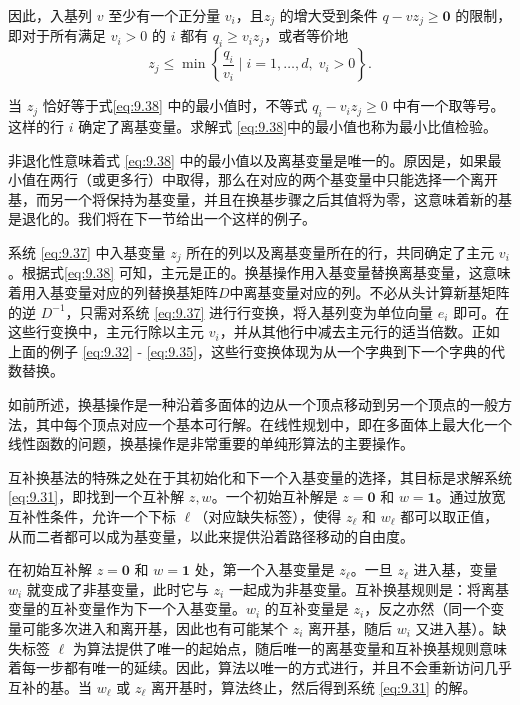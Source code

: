 因此，入基列 \(v\) 至少有一个正分量 \({v}_{i}\)，且\({z}_{j}\) 的增大受到条件 \(q - v{z}_{j} \geq  \mathbf{0}\) 的限制，即对于所有满足 \({v}_{i} > 0\) 的 \(i\) 都有 \({q}_{i} \geq  {v}_{i}{z}_{j}\)，或者等价地
\begin{equation}
\label{eq:9.38}
{z}_{j} \leq  \min \left\{  {\frac{{q}_{i}}{{v}_{i}} \mid  i = 1,\ldots,d,\; {v}_{i} > 0}\right\}.
\end{equation}

当 \({z}_{j}\) 恰好等于式\eqref{eq:9.38} 中的最小值时，不等式 \({q}_{i} - {v}_{i}{z}_{j} \geq  0\) 中有一个取等号。这样的行 \(i\) 确定了离基变量。求解式 \eqref{eq:9.38}中的最小值也称为最小比值检验。

非退化性意味着式 \eqref{eq:9.38} 中的最小值以及离基变量是唯一的。原因是，如果最小值在两行（或更多行）中取得，那么在对应的两个基变量中只能选择一个离开基，而另一个将保持为基变量，并且在换基步骤之后其值将为零，这意味着新的基是退化的。我们将在下一节给出一个这样的例子。

系统 \eqref{eq:9.37} 中入基变量 \({z}_{j}\) 所在的列以及离基变量所在的行，共同确定了主元 \({v}_{i}\)。根据式\eqref{eq:9.38} 可知，主元是正的。换基操作用入基变量替换离基变量，这意味着用入基变量对应的列替换基矩阵\(D\)中离基变量对应的列。不必从头计算新基矩阵的逆 \({D}^{-1}\)，只需对系统 \eqref{eq:9.37} 进行行变换，将入基列变为单位向量 \({e}_{i}\) 即可。在这些行变换中，主元行除以主元 \({v}_{i}\)，并从其他行中减去主元行的适当倍数。正如上面的例子 \eqref{eq:9.32}  - \eqref{eq:9.35}，这些行变换体现为从一个字典到下一个字典的代数替换。


如前所述，换基操作是一种沿着多面体的边从一个顶点移动到另一个顶点的一般方法，其中每个顶点对应一个基本可行解。在线性规划中，即在多面体上最大化一个线性函数的问题，换基操作是非常重要的单纯形算法的主要操作。

互补换基法的特殊之处在于其初始化和下一个入基变量的选择，其目标是求解系统 \eqref{eq:9.31}，即找到一个互补解 \(z,w\)。一个初始互补解是 \(z = \mathbf{0}\) 和 \(w = \mathbf{1}\)。通过放宽互补性条件，允许一个下标 \(\ell\)（对应缺失标签），使得 \({z}_{\ell }\) 和 \({w}_{\ell }\) 都可以取正值，从而二者都可以成为基变量，以此来提供沿着路径移动的自由度。

在初始互补解 \(z = \mathbf{0}\) 和 \(w = \mathbf{1}\) 处，第一个入基变量是 \({z}_{\ell }\)。一旦 \({z}_{\ell }\) 进入基，变量 \({w}_{i}\) 就变成了非基变量，此时它与 \({z}_{i}\) 一起成为非基变量。互补换基规则是：将离基变量的互补变量作为下一个入基变量。\({w}_{i}\) 的互补变量是 \({z}_{i}\)，反之亦然（同一个变量可能多次进入和离开基，因此也有可能某个 \({z}_{i}\) 离开基，随后 \({w}_{i}\) 又进入基）。缺失标签 \(\ell\) 为算法提供了唯一的起始点，随后唯一的离基变量和互补换基规则意味着每一步都有唯一的延续。因此，算法以唯一的方式进行，并且不会重新访问几乎互补的基。当 \({w}_{\ell }\) 或 \({z}_{\ell }\) 离开基时，算法终止，然后得到系统 \eqref{eq:9.31} 的解。


